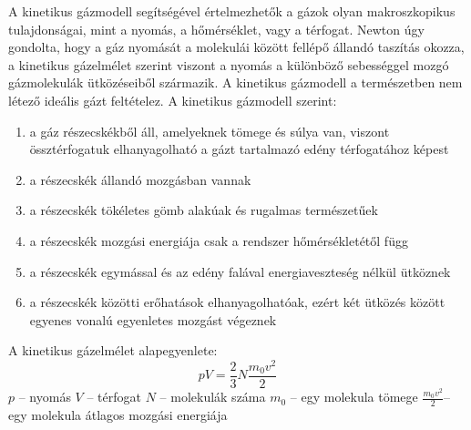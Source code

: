 A kinetikus gázmodell segítségével értelmezhetők a gázok olyan makroszkopikus tulajdonságai, mint a nyomás, a hőmérséklet, vagy a térfogat. Newton úgy gondolta, hogy a gáz nyomását a molekulái között fellépő állandó taszítás okozza, a kinetikus gázelmélet szerint viszont a nyomás a különböző sebességgel mozgó gázmolekulák ütközéseiből származik. A kinetikus gázmodell a természetben nem létező ideális gázt feltételez.
A kinetikus gázmodell szerint:
\begin{enumerate}
	\item a gáz részecskékből áll, amelyeknek tömege és súlya van, viszont össztérfogatuk elhanyagolható a gázt tartalmazó edény térfogatához képest
	\item a részecskék állandó mozgásban vannak
	\item a részecskék tökéletes gömb alakúak és rugalmas természetűek
	\item a részecskék mozgási energiája csak a rendszer hőmérsékletétől függ
	\item a részecskék egymással és az edény falával energiaveszteség nélkül ütköznek
	\item a részecskék közötti erőhatások elhanyagolhatóak, ezért két ütközés között egyenes vonalú egyenletes mozgást végeznek
\end{enumerate}
A kinetikus gázelmélet alapegyenlete:
$$ pV = \frac{2}{3}N \frac{m_0v^2}{2}$$
$p$ – nyomás
$V$ – térfogat
$N$ – molekulák száma
$m_0$ – egy molekula tömege
$\frac{m_0v^2}{2}$– egy molekula átlagos mozgási energiája